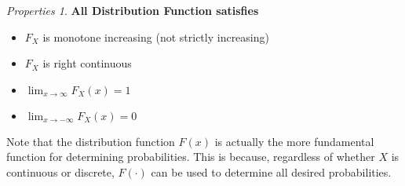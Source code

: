 \documentclass[twoside]{article}
\theoremstyle{definition}
\theoremstyle{remark}
\newtheorem{properties}[theorem]{Properties}
\theoremstyle{remark}
\begin{document}
\begin{properties}{\bf All Distribution Function satisfies}
  \begin{itemize}
    \item $F_X$ is monotone increasing (not strictly increasing)
    \item $F_X$ is right continuous
    \item $\lim_{x \rightarrow \infty} F_X(x) = 1$
    \item $\lim_{x \rightarrow -\infty} F_X(x) = 0$
  \end{itemize}
\end{properties}

Note that the distribution function $F(x)$ is actually the more fundamental function
for determining probabilities. This is because, regardless of whether $X$ is continuous
or discrete, $F(\cdot)$ can be used to determine all desired probabilities.
\end{document}
